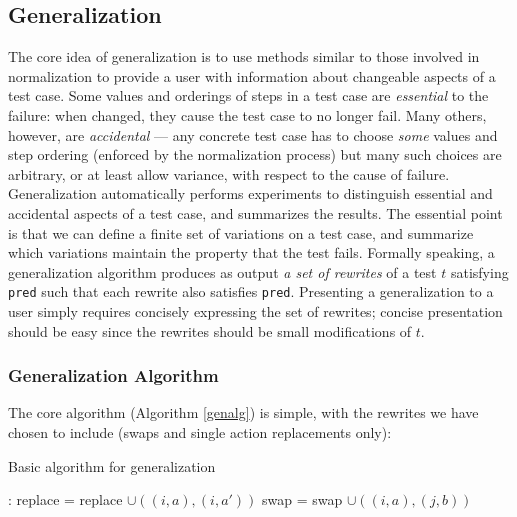 



\subsection{Generalization}



The core idea of generalization is to use methods similar to those
involved in normalization to provide a user with information about
changeable aspects of a test case.  Some values and orderings of steps
in a test case are \emph{essential} to the failure: when changed, they
cause the test case to no longer fail.  Many others, however, are
\emph{accidental} --- any concrete test case has to choose \emph{some}
values and step ordering (enforced by the normalization
process) but many such choices are arbitrary, or at least allow
variance, with respect to the cause of failure.  Generalization
automatically performs experiments to distinguish essential and accidental aspects
of a test case, and summarizes the results.  The essential point is that we
can define a finite set of variations on a test case, and summarize which
variations maintain the property that the test fails.  Formally
speaking, a generalization algorithm produces as output \emph{a set of
  rewrites} of a test $t$ satisfying {\tt pred} such that each rewrite
also satisfies {\tt pred}.  Presenting a generalization to a user simply requires
concisely expressing the set of rewrites; concise presentation should
be easy since the rewrites should be small modifications of $t$.

\subsubsection{Generalization Algorithm}

The core algorithm
(Algorithm \ref{genalg}) is simple, with the rewrites we have chosen
to include (swaps and single action replacements only):

\begin{algorithm}
\caption{Basic algorithm for generalization}
\label{genalg}
\begin{algorithmic}[1]
:
\State replace = replace $\cup ((i,a),(i,a'))$
\EndIf
\EndFor 
{}
\State swap = swap $\cup ((i,a),(j,b))$
\EndIf
\EndFor
\EndFor
{}
\end{algorithmic}
\end{algorithm}

